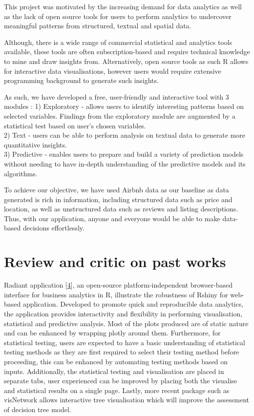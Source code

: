 \documentclass{acm_proc_article-sp}
\begin{document}
This project was motivated by the increasing demand for data analytics
as well as the lack of open source tools for users to perform analytics
to undercover meaningful patterns from structured, textual and spatial
data.

Although, there is a wide range of commercial statistical and analytics
tools available, these tools are often subscription-based and require
technical knowledge to mine and draw insights from. Alternatively, open
source tools as such R allows for interactive data visualisations,
however users would require extensive programming background to generate
such insights.

As such, we have developed a free, user-friendly and interactive tool
with 3 modules : 1) Exploratory - allows users to identify interesting
patterns based on selected variables. Findings from the exploratory
module are augmented by a statistical test based on user's chosen
variables.\\
2) Text - users can be able to perform analysis on textual data to
generate more quantitative insights.\\
3) Predictive - enables users to prepare and build a variety of
prediction models without needing to have in-depth understanding of the
predictive models and its algorithms.

To achieve our objective, we have used Airbnb data as our baseline as
data generated is rich in information, including structured data such as
price and location, as well as unstructured data such as reviews and
listing descriptions. Thus, with our application, anyone and everyone
would be able to make data-based decisions effortlessly.

\hypertarget{review-and-critic-on-past-works}{%
\section{Review and critic on past
works}\label{review-and-critic-on-past-works}}

Radiant application {[}\protect\hyperlink{ref-radiant2019}{4}{]}, an
open-source platform-independent browser-based interface for business
analytics in R, illustrate the robustness of Rshiny for web-based
application. Developed to promote quick and reproducible data analytics,
the application provides interactivity and flexibility in performing
visualisation, statistical and predictive analysis. Most of the plots
produced are of static nature and can be enhanced by wrapping plotly
around them. Furthermore, for statistical testing, users are expected to
have a basic understanding of statistical testing methods as they are
first required to select their testing method before proceeding, this
can be enhanced by automating testing methods based on inputs.
Additionally, the statistical testing and visualisation are placed in
separate tabs, user experienced can be improved by placing both the
visualise and statistical results on a single page. Lastly, more recent
package such as visNetwork allows interactive tree visualisation which
will improve the assessment of decision tree model.
\end{document}
